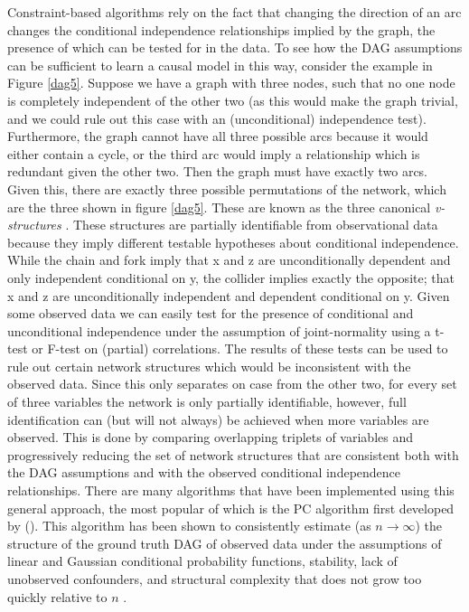 \documentclass{article}
\begin{document}
Constraint-based algorithms rely on the fact that changing the direction of an arc changes the conditional independence relationships implied by the graph, the presence of which can be tested for in the data. To see how the DAG assumptions can be sufficient to learn a causal model in this way, consider the example in Figure \ref{dag5}. Suppose we have a graph with three nodes, such that no one node is completely independent of the other two (as this would make the graph trivial, and we could rule out this case with an (unconditional) independence test). Furthermore, the graph cannot have all three possible arcs because it would either contain a cycle, or the third arc would imply a relationship which is redundant given the other two. Then the graph must have exactly two arcs. Given this, there are exactly three possible permutations of the network, which are the three shown in figure \ref{dag5}. These are known as the three canonical \textit{v-structures} \parencite{pearl2014probabilistic}. These structures are partially identifiable from observational data because they imply different testable hypotheses about conditional independence. While the chain and fork imply that x and z are unconditionally dependent and only independent conditional on y, the collider implies exactly the opposite; that x and z are unconditionally independent and dependent conditional on y. Given some observed data we can easily test for the presence of conditional and unconditional independence under the assumption of joint-normality using a t-test or F-test on (partial) correlations. The results of these tests can be used to rule out certain network structures which would be inconsistent with the observed data. Since this only separates on case from the other two, for every set of three variables the network is only partially identifiable, however, full identification can (but will not always) be achieved when more variables are observed. This is done by comparing overlapping triplets of variables and progressively reducing the set of network structures that are consistent both with the DAG assumptions and with the observed conditional independence relationships. There are many algorithms that have been implemented using this general approach, the most popular of which is the PC algorithm first developed by \citeauthor{spirtes1991algorithm} (\citeyear{spirtes1991algorithm}). This algorithm has been shown to consistently estimate (as $n \rightarrow \infty$) the structure of the ground truth DAG of observed data under the assumptions of linear and Gaussian conditional probability functions, stability, lack of unobserved confounders, and structural complexity that does not grow too quickly relative to $n$ \parencite{kalisch2007estimating}. 
\end{document}

